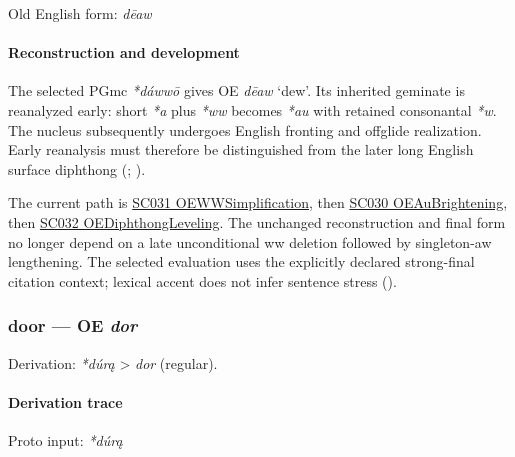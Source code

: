 \documentclass[
  british,
  a4paper,
]{article}
\begin{document}
Old English form: \emph{dēaw}

\paragraph{Reconstruction and
development}\label{reconstruction-and-development}

The selected PGmc \emph{*dáwwō} gives OE \emph{dēaw} `dew'. Its
inherited geminate is reanalyzed early: short \emph{*a} plus \emph{*ww}
becomes \emph{*au} with retained consonantal \emph{*w}. The nucleus
subsequently undergoes English fronting and offglide realization. Early
reanalysis must therefore be distinguished from the later long English
surface diphthong (; ).

The current path is \hyperref[rule-OEWWSimplification]{SC031
OEWWSimplification}, then \hyperref[rule-OEAuBrightening]{SC030
OEAuBrightening}, then \hyperref[rule-OEDiphthongLeveling]{SC032
OEDiphthongLeveling}. The unchanged reconstruction and final form no
longer depend on a late unconditional ww deletion followed by
singleton-aw lengthening. The selected evaluation uses the explicitly
declared strong-final citation context; lexical accent does not infer
sentence stress ().

\subsubsection{\texorpdfstring{door --- OE
\emph{dor}}{door --- OE dor}}\label{door-oe-dor}

Derivation: \emph{*dúrą} \textgreater{} \emph{dor} (regular).

\paragraph{Derivation trace}\label{derivation-trace-15}

Proto input: \emph{*dúrą}

\begingroup
\setlength{\fboxsep}{6pt}
\end{document}
